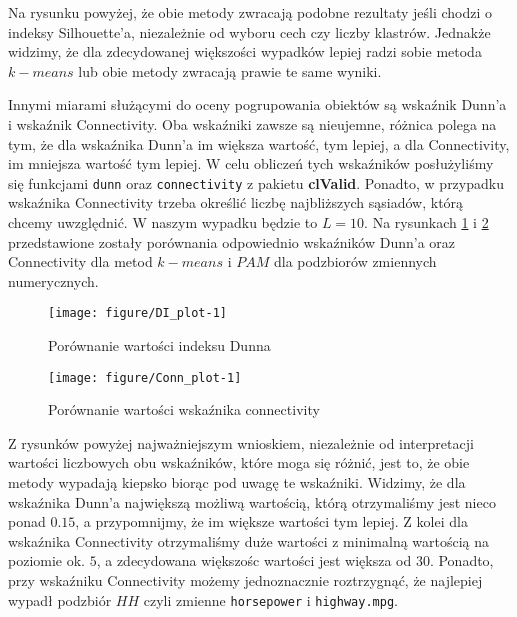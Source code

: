 \documentclass[12pt, a4paper]{article}\usepackage[]{graphicx}\usepackage[]{xcolor}
\makeatletter
\def\maxwidth{ %
  \ifdim\Gin@nat@width>\linewidth
    \linewidth
  \else
    \Gin@nat@width
  \fi
}
\newenvironment{knitrout}{}{} %
\makeatother
\begin{document}
Na rysunku powyżej, że obie metody zwracają podobne rezultaty jeśli chodzi o indeksy Silhouette'a, niezależnie od wyboru cech czy liczby klastrów. Jednakże widzimy, że dla zdecydowanej większości wypadków lepiej radzi sobie metoda $k-means$ lub obie metody zwracają prawie te same wyniki.

\par
Innymi miarami służącymi do oceny pogrupowania obiektów są wskaźnik Dunn'a \cite{Dunn} i wskaźnik Connectivity. Oba wskaźniki zawsze są nieujemne, różnica polega na tym, że dla wskaźnika Dunn'a im większa wartość, tym lepiej, a dla Connectivity, im mniejsza wartość tym lepiej. W celu obliczeń tych wskaźników posłużyliśmy się funkcjami \texttt{dunn} oraz \texttt{connectivity} z pakietu \textbf{clValid}. Ponadto, w przypadku wskaźnika Connectivity trzeba określić liczbę najbliższych sąsiadów, którą chcemy uwzględnić. W naszym wypadku będzie to $L=10$. Na rysunkach \ref{fig:DI_plot} i \ref{fig:Conn_plot} przedstawione zostały porównania odpowiednio wskaźników Dunn'a oraz Connectivity dla metod $k-means$ i $PAM$ dla podzbiorów zmiennych numerycznych. 



\begin{knitrout}
\color{fgcolor}\begin{figure}[H]

{\centering \texttt{[image: figure/DI\_plot-1]} 

}

\caption[Porównanie wartości indeksu Dunna]{Porównanie wartości indeksu Dunna}\label{fig:DI_plot}
\end{figure}

\end{knitrout}

\begin{knitrout}
\color{fgcolor}\begin{figure}[H]

{\centering \texttt{[image: figure/Conn\_plot-1]} 

}

\caption[Porównanie wartości wskaźnika connectivity]{Porównanie wartości wskaźnika connectivity}\label{fig:Conn_plot}
\end{figure}

\end{knitrout}

Z rysunków powyżej najważniejszym wnioskiem, niezależnie od interpretacji wartości liczbowych obu wskaźników, które moga się różnić, jest to, że obie metody wypadają kiepsko biorąc pod uwagę te wskaźniki. Widzimy, że dla wskaźnika Dunn'a największą możliwą wartością, którą otrzymaliśmy jest nieco ponad $0.15$, a przypomnijmy, że im większe wartości tym lepiej. Z kolei dla wskaźnika Connectivity otrzymaliśmy duże wartości z minimalną wartością na poziomie ok. $5$, a zdecydowana większośc wartości jest większa od $30$. Ponadto, przy wskaźniku Connectivity możemy jednoznacznie roztrzygnąć, że najlepiej wypadł podzbiór $HH$ czyli zmienne \texttt{horsepower} i \texttt{highway.mpg}.
\end{document}
